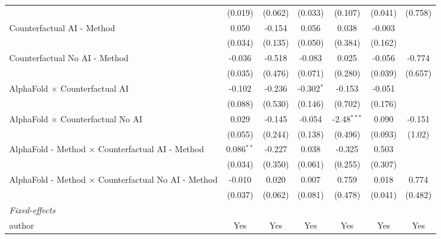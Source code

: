 \begin{tabular}{lcccccc}
                                                              & (0.019)       & (0.062)      & (0.033)      & (0.107)       & (0.041)       & (0.758)\\   
   Counterfactual AI - Method                                 & 0.050         & -0.154       & 0.056        & 0.038         & -0.003        &   \\   
                                                              & (0.034)       & (0.135)      & (0.050)      & (0.384)       & (0.162)       &   \\   
   Counterfactual No AI - Method                              & -0.036        & -0.518       & -0.083       & 0.025         & -0.056        & -0.774\\   
                                                              & (0.035)       & (0.476)      & (0.071)      & (0.280)       & (0.039)       & (0.657)\\   
   AlphaFold $\times$ Counterfactual AI                       & -0.102        & -0.236       & -0.302$^{*}$ & -0.153        & -0.051        &   \\   
                                                              & (0.088)       & (0.530)      & (0.146)      & (0.702)       & (0.176)       &   \\   
   AlphaFold $\times$ Counterfactual No AI                    & 0.029         & -0.145       & -0.054       & -2.48$^{***}$ & 0.090         & -0.151\\   
                                                              & (0.055)       & (0.244)      & (0.138)      & (0.496)       & (0.093)       & (1.02)\\   
   AlphaFold - Method $\times$ Counterfactual AI - Method     & 0.086$^{**}$  & -0.227       & 0.038        & -0.325        & 0.503         &   \\   
                                                              & (0.034)       & (0.350)      & (0.061)      & (0.255)       & (0.307)       &   \\   
   AlphaFold - Method $\times$ Counterfactual No AI - Method  & -0.010        & 0.020        & 0.007        & 0.759         & 0.018         & 0.774\\   
                                                              & (0.037)       & (0.062)      & (0.081)      & (0.478)       & (0.041)       & (0.482)\\   
   \midrule
   \emph{Fixed-effects}\\
   author                                                     & Yes           & Yes          & Yes          & Yes           & Yes           & Yes\\  

\end{tabular}
